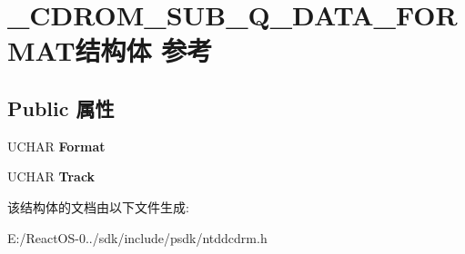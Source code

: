 \hypertarget{struct___c_d_r_o_m___s_u_b___q___d_a_t_a___f_o_r_m_a_t}{}\section{\+\_\+\+C\+D\+R\+O\+M\+\_\+\+S\+U\+B\+\_\+\+Q\+\_\+\+D\+A\+T\+A\+\_\+\+F\+O\+R\+M\+A\+T结构体 参考}
\label{struct___c_d_r_o_m___s_u_b___q___d_a_t_a___f_o_r_m_a_t}
\subsection*{Public 属性}
\begin{DoxyCompactItemize}
\item 
\mbox{\label{struct___c_d_r_o_m___s_u_b___q___d_a_t_a___f_o_r_m_a_t_aa1480a5b06608be7f8ab0d08923ed5a4}} 
U\+C\+H\+AR {\bfseries Format}
\item 
\mbox{\label{struct___c_d_r_o_m___s_u_b___q___d_a_t_a___f_o_r_m_a_t_a1e6295ea3377dcb620ed17b42301268c}} 
U\+C\+H\+AR {\bfseries Track}
\end{DoxyCompactItemize}


该结构体的文档由以下文件生成\+:\begin{DoxyCompactItemize}
\item 
E\+:/\+React\+O\+S-\/0../sdk/include/psdk/ntddcdrm.\+h\end{DoxyCompactItemize}
